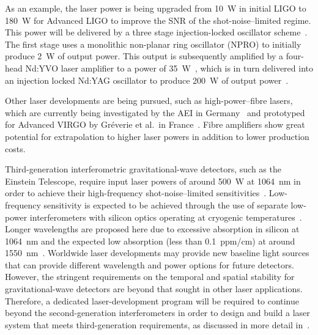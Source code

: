 \documentclass{article}
\begin{document}
As an example, the laser power is being upgraded from 10~W in initial LIGO to
180~W for Advanced LIGO to improve the SNR of the shot-noise--limited regime.
This power will be delivered by a three stage injection-locked oscillator
scheme~\cite{Cregut, Nabors, Golla, Frede:2005}.  The first stage uses a
monolithic non-planar ring oscillator (NPRO) to initially produce 2~W of output
power.  This output is subsequently amplified by a four-head Nd:YVO laser
amplifier to a power of 35~W~\cite{Frede:2007}, which is in turn delivered into
an injection locked Nd:YAG oscillator to produce 200~W of output
power~\cite{Wilke:2008}.

Other laser developments are being pursued, such as high-power--fibre
lasers, which are currently being investigated by the AEI in
Germany~\cite{Schnabel:2010} and prototyped for Advanced VIRGO by
Gr\'{e}verie et al.\ in France~\cite{Greverie:2010}. Fibre amplifiers
show great potential for extrapolation to higher laser powers in
addition to lower production costs.

Third-generation interferometric gravitational-wave detectors, such as the
Einstein Telescope, require input laser powers of around 500~W at 1064~nm in
order to achieve their high-frequency shot-noise--limited
sensitivities~\cite{Hild:2010}.  Low-frequency sensitivity is expected to be
achieved through the use of separate low-power interferometers with silicon
optics operating at cryogenic temperatures~\cite{Rowan:2003, Punturo:2010}.
Longer wavelengths are proposed here due to excessive absorption in silicon at
1064~nm and the expected low absorption (less than 0.1~ppm/cm) at
around 1550~nm~\cite{Green:1995}. Worldwide laser developments may
provide new baseline light sources that can provide different
wavelength and power options for future detectors. However, the
stringent requirements on the temporal and spatial stability for
gravitational-wave detectors are beyond that sought in other laser
applications. Therefore, a dedicated laser-development program will be
required to continue beyond the second-generation interferometers in
order to design and build a laser system that meets third-generation
requirements, as discussed in more detail in~\cite{Mavalvala:2010}.

\end{document}
